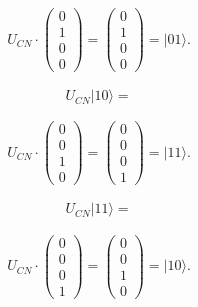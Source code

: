 \documentclass[12pt]{article}
\newcommand{\bea}{\begin{eqnarray}}
\newcommand{\eea}{\end{eqnarray}}
\newcommand{\ket}[1]{\vert{#1}\rangle}
\begin{document}
\begin{enumerate}
\begin{enumerate}
    \bea
U_{CN} \cdot \left(\begin{array}{c} 0 \\ 1 \\ 0 \\ 0 \end{array}\right) =  \left(\begin{array}{c} 0 \\ 1 \\ 0 \\ 0 \end{array}\right) = \ket{01}.
    \eea

    $$
 U_{CN}\ket{10} = 
    $$
    
    \bea
U_{CN} \cdot \left(\begin{array}{c} 0 \\ 0 \\ 1 \\ 0 \end{array}\right) =  \left(\begin{array}{c} 0 \\ 0 \\ 0 \\ 1 \end{array}\right) = \ket{11}.
    \eea

    $$
 U_{CN}\ket{11} = 
    $$
    
    \bea
U_{CN} \cdot \left(\begin{array}{c} 0 \\ 0 \\ 0 \\ 1 \end{array}\right) =  \left(\begin{array}{c} 0 \\ 0 \\ 1 \\ 0 \end{array}\right) = \ket{10}.
    \eea

\end{enumerate}



\end{enumerate}
\end{document}
